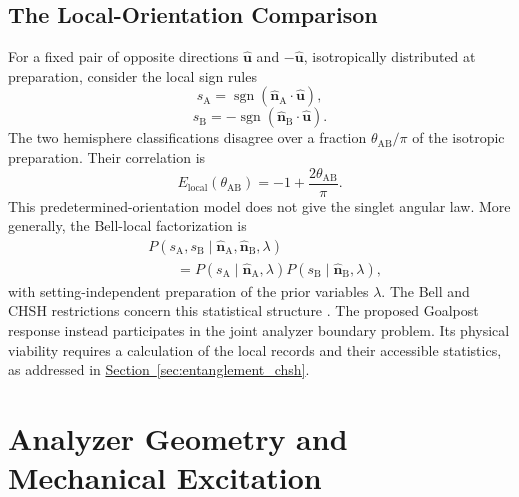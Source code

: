 \subsection{The Local-Orientation Comparison}
\label{sec:entanglement_local_nogo}

For a fixed pair of opposite directions $\widehat{\mathbf u}$ and $-\widehat{\mathbf u}$, isotropically distributed at preparation, consider the local sign rules
\begin{equation}
    s_{\mathrm A}
    =\operatorname{sgn}(\widehat{\mathbf n}_{\mathrm A}\cdot\widehat{\mathbf u}),
    \label{eq:entanglement_local_A}
\end{equation}
\begin{equation}
    s_{\mathrm B}
    =-\operatorname{sgn}(\widehat{\mathbf n}_{\mathrm B}\cdot\widehat{\mathbf u}).
    \label{eq:entanglement_local_B}
\end{equation}
The two hemisphere classifications disagree over a fraction $\theta_{\mathrm{AB}}/\pi$ of the isotropic preparation. Their correlation is
\begin{equation}
    E_{\mathrm{local}}(\theta_{\mathrm{AB}})
    =-1+\frac{2\theta_{\mathrm{AB}}}{\pi}.
    \label{eq:entanglement_local_correlation}
\end{equation}
This predetermined-orientation model does not give the singlet angular law. More generally, the Bell-local factorization is
\begin{equation}
    \begin{aligned}
    &P(s_{\mathrm A},s_{\mathrm B}\mid
       \widehat{\mathbf n}_{\mathrm A},\widehat{\mathbf n}_{\mathrm B},\lambda)\\
    &\qquad=P(s_{\mathrm A}\mid\widehat{\mathbf n}_{\mathrm A},\lambda)
             P(s_{\mathrm B}\mid\widehat{\mathbf n}_{\mathrm B},\lambda),
    \end{aligned}
    \label{eq:entanglement_bell_factorization}
\end{equation}
with setting-independent preparation of the prior variables $\lambda$. The Bell and CHSH restrictions concern this statistical structure \cite{Bell_1964,CHSH_1969}. The proposed Goalpost response instead participates in the joint analyzer boundary problem. Its physical viability requires a calculation of the local records and their accessible statistics, as addressed in \hyperref[sec:entanglement_chsh]{Section~\ref*{sec:entanglement_chsh}}.

\section{Analyzer Geometry and Mechanical Excitation}
\label{sec:entanglement_analyzer_coupling}

